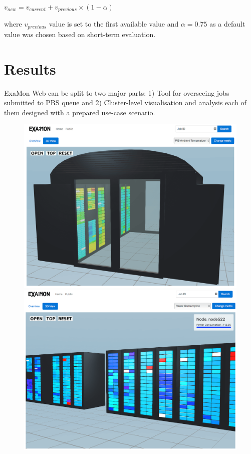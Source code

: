 \documentclass[a4paper, twoside]{article}
\begin{document}
\begin{multicols}{3}
$v_{new} = v_{current} + v_{previous} \times (1 - \alpha)$

\noindent where $v_{previous}$ value is set to the first available value and $\alpha = 0.75$ as a default value was chosen based on short-term evaluation.

\section*{Results}
ExaMon Web can be split to two major parts: 1) Tool for overseeing jobs submitted to PBS queue and 2) Cluster-level visualisation and analysis each of them designed with a prepared use-case scenario.

\begin{figure}[t!]
    \includegraphics[width=2\columnwidth+\columnsep]{public-3d}
    \hspace{\columnsep}
    \begin{minipage}[b]{\columnwidth}
        \includegraphics[width=\linewidth]{3d-open}

\end{minipage}
\end{figure}
\end{multicols}
\end{document}
